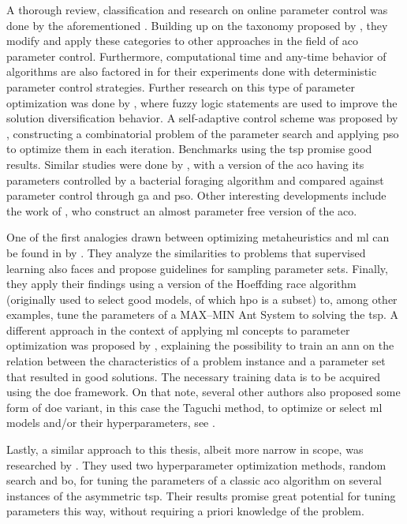  A thorough review, classification and research on online parameter control was done by the aforementioned \cite{stutzle2012parameter}. Building up on the taxonomy proposed by \citeauthor{eiben1999parameter}, they modify and apply these categories to other approaches in the field of \gls{aco} parameter control. Furthermore, computational time and any-time behavior of algorithms are also factored in for their experiments done with deterministic parameter control strategies. Further research on this type of parameter optimization was done by \citet{neyoy2013dynamic}, where fuzzy logic statements are used to improve the solution diversification behavior. 
 A self-adaptive control scheme was proposed by \citet{hao2006adaptive}, constructing a combinatorial problem of the parameter search and applying \gls{pso} to optimize them in each iteration. Benchmarks using the \gls{tsp} promise good results. Similar studies were done by \citet{li2016parameter}, with a version of the \gls{aco} having its parameters controlled by a bacterial foraging algorithm and compared against parameter control through \gls{ga} and \gls{pso}.
 Other interesting developments include the work of \citet{randall2004near}, who construct an almost parameter free version of the \gls{aco}.
 
One of the first analogies drawn between optimizing metaheuristics and \gls{ml} can be found in  by \citet{birattari2009tuning}. They analyze the similarities to problems that supervised learning also faces and propose guidelines for sampling parameter sets. Finally, they apply their findings using a version of the Hoeffding race algorithm \cite{maron1993hoeffding} (originally used to select good models, of which \gls{hpo} is a subset) to, among other examples, tune the parameters of a MAX–MIN Ant System to solving the \gls{tsp}.
A different approach in the context of applying \gls{ml} concepts to parameter optimization was proposed by \citet{dobslaw2010parameter}, explaining the possibility to train an \gls{ann} on the relation between the characteristics of a problem instance and a parameter set that resulted in good solutions. The necessary training data is to be acquired using the \gls{doe} framework. On that note, several other authors also proposed some form of \gls{doe} variant, in this case the Taguchi method, to optimize or select \gls{ml} models and/or their hyperparameters, see \cite{packianather2000optimizing, tortum2007investigation, jung2011artificial}.

Lastly, a similar approach to this thesis, albeit more narrow in scope, was researched by \citet{yin2021bayesian}. They used two hyperparameter optimization methods, random search and \gls{bo}, for tuning the parameters of a classic \gls{aco} algorithm on several instances of the asymmetric \gls{tsp}. Their results promise great potential for tuning parameters this way, without requiring a priori knowledge of the problem.